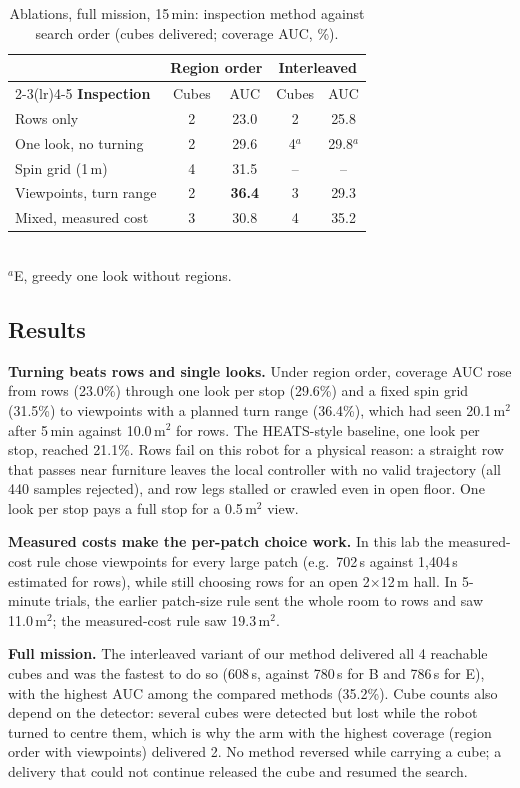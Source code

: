 \documentclass[conference,a4paper,10pt]{IEEEtran}
\begin{document}
\begin{table}[t]
\caption{Ablations, full mission, 15\,min: inspection method against search
order (cubes delivered; coverage AUC, \%).}
\label{tab:abl}
\centering
\setlength{\tabcolsep}{4pt}
\begin{tabular}{lcccc}
\toprule
& \multicolumn{2}{c}{\textbf{Region order}} & \multicolumn{2}{c}{\textbf{Interleaved}} \\
\cmidrule(lr){2-3}\cmidrule(lr){4-5}
\textbf{Inspection} & Cubes & AUC & Cubes & AUC \\
\midrule
Rows only              & 2 & 23.0 & 2 & 25.8 \\
One look, no turning   & 2 & 29.6 & 4\(^{a}\) & 29.8\(^{a}\) \\
Spin grid (1\,m)       & 4 & 31.5 & -- & -- \\
Viewpoints, turn range & 2 & \textbf{36.4} & 3 & 29.3 \\
Mixed, measured cost   & 3 & 30.8 & 4 & 35.2 \\
\bottomrule
\end{tabular}\\[2pt]
{\scriptsize \(^{a}\)E, greedy one look without regions.}
\end{table}

\subsection{Results}
\textbf{Turning beats rows and single looks.} Under region order, coverage AUC
rose from rows (23.0\%) through one look per stop (29.6\%) and a fixed spin grid
(31.5\%) to viewpoints with a planned turn range (36.4\%), which had seen
20.1\,m\(^2\) after 5\,min against 10.0\,m\(^2\) for rows. The HEATS-style
baseline, one look per stop, reached 21.1\%. Rows fail on this robot for a
physical reason: a straight row that passes near furniture leaves the local
controller with no valid trajectory (all 440 samples rejected), and row legs
stalled or crawled even in open floor. One look per stop pays a full stop for a
0.5\,m\(^2\) view.

\textbf{Measured costs make the per-patch choice work.} In this lab the
measured-cost rule chose viewpoints for every large patch (e.g.\ 702\,s against
1{,}404\,s estimated for rows), while still choosing rows for an open
2\(\times\)12\,m hall. In 5-minute trials, the earlier patch-size rule sent the
whole room to rows and saw 11.0\,m\(^2\); the measured-cost rule saw
19.3\,m\(^2\).

\textbf{Full mission.} The interleaved variant of our method delivered all 4
reachable cubes and was the fastest to do so (608\,s, against 780\,s for B and
786\,s for E), with the highest AUC among the compared methods (35.2\%). Cube
counts also depend on the detector: several cubes were detected but lost while
the robot turned to centre them, which is why the arm with the highest coverage
(region order with viewpoints) delivered 2. No method reversed
while carrying a cube; a delivery that could not continue released the cube and
resumed the search.
\end{document}
